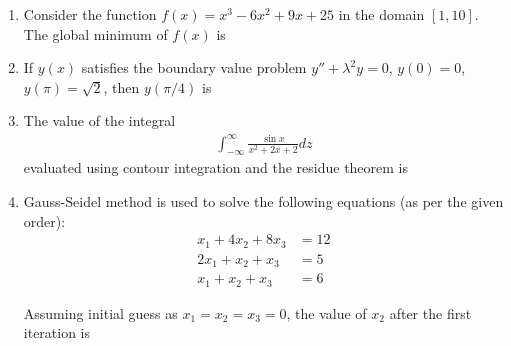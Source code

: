 \documentclass[journal,11pt,onecolumn]{IEEEtran}
\begin{document}
\begin{enumerate}[resume]

    \item Consider the function $f(x) = x^3 - 6x^2 + 9x + 25$ in the domain $[1, 10]$. The global minimum of $f(x)$ is \underline{\hspace{2cm}}

    \item If $y(x)$ satisfies the boundary value problem $y'' + \lambda^2 y = 0$, $y(0) = 0$, $y(\pi) = \sqrt{2}$, then $y(\pi/4)$ is \underline{\hspace{2cm}}

    \item The value of the integral
          \begin{align}
              \int_{-\infty}^{\infty} \frac{\sin x}{x^2 + 2x + 2} dz
          \end{align}
          evaluated using contour integration and the residue theorem is

          \begin{enumerate}


          \end{enumerate}

    \item Gauss-Seidel method is used to solve the following equations (as per the given order):
          \begin{align}
              x_1 + 4x_2 + 8x_3 & = 12 \\
              2x_1 + x_2 + x_3  & = 5  \\
              x_1 + x_2 + x_3   & = 6
          \end{align}

          Assuming initial guess as $x_1 = x_2 = x_3 = 0$, the value of $x_2$ after the first iteration is \underline{\hspace{2cm}}


\end{enumerate}
\end{document}
